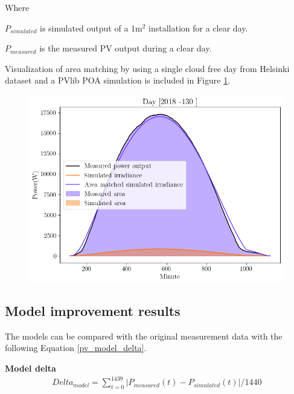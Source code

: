 \noindent Where

$P_{simulated}$ is simulated output of a 1m$^2$ installation for a clear day.

$P_{measured}$ is the measured PV output during a clear day.


\noindent Visualization of area matching by using a single cloud free day from Helsinki dataset and a PVlib POA simulation is included in Figure \ref{fig_area_match}.







\begin{figure}[h]
\centering
\includegraphics[width=0.7\linewidth]{pics/areamatching2}
\label{fig_area_match}
\end{figure}

\newpage
\subsection{Model improvement results}
The models can be compared with the original measurement data with the following Equation \ref{pv_model_delta}.



\noindent\textbf{Model delta}
\begin{equation}
\begin{split}
\label{pv_model_delta}
Delta_{model} = \sum_{t=0}^{1439} |P_{measured}(t) - P_{simulated}(t)| /1440
\end{split}
\end{equation}

